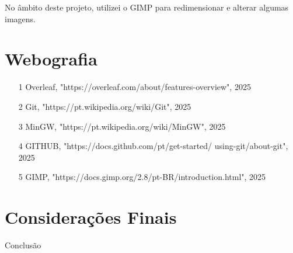\documentclass[a4paper,12pt]{article}
\begin{document}
No âmbito deste projeto, utilizei o GIMP para redimensionar e alterar algumas imagens.

\section{Webografia}
\begin{itemize}
    \item [1] Overleaf, "https://overleaf.com/about/features-overview", 2025

    \item [2] Git, "https://pt.wikipedia.org/wiki/Git", 2025

    \item [3] MinGW, "https://pt.wikipedia.org/wiki/MinGW", 2025
    
    \item [4] GITHUB, "https://docs.github.com/pt/get-started/
    \newline
    using-git/about-git", 2025
    
    \item [5] GIMP, "https://docs.gimp.org/2.8/pt-BR/introduction.html", 2025
    
\end{itemize}

\section{Considerações Finais}

Conclusão
\end{document}
